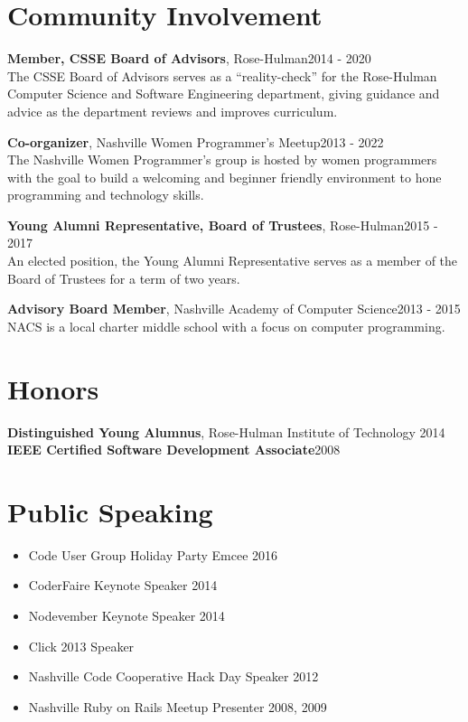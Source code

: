 \documentclass[line, margin, 10pt]{res}
\begin{document}
\begin{resume}
\section{Community Involvement}

{\bf Member, CSSE Board of Advisors}, Rose-Hulman\hfill 2014 - 2020\\
The CSSE Board of Advisors serves as a ``reality-check'' for the Rose-Hulman Computer Science and Software Engineering department, giving guidance and advice as the department reviews and improves curriculum.

{\bf Co-organizer}, Nashville Women Programmer's Meetup\hfill 2013 - 2022\\
The Nashville Women Programmer's group is hosted by women programmers with the goal to build a welcoming and beginner friendly environment to hone programming and technology skills.

{\bf Young Alumni Representative, Board of Trustees}, Rose-Hulman\hfill 2015 - 2017\\
An elected position, the Young Alumni Representative serves as a member of the Board of Trustees for a term of two years.

{\bf Advisory Board Member}, Nashville Academy of Computer Science\hfill 2013 - 2015\\
NACS is a local charter middle school with a focus on computer programming.

\section{Honors}

{\bf Distinguished Young Alumnus}, Rose-Hulman Institute of Technology \hfill 2014\\
{\bf IEEE Certified Software Development Associate}\hfill 2008

\section{Public Speaking}

\begin{itemize}\itemsep -2pt
  \item Code User Group Holiday Party Emcee 2016
  \item CoderFaire Keynote Speaker 2014
  \item Nodevember Keynote Speaker 2014
  \item Click 2013 Speaker
  \item Nashville Code Cooperative Hack Day Speaker 2012
  \item Nashville Ruby on Rails Meetup Presenter 2008, 2009
\end{itemize}


\end{resume}
\end{document}
